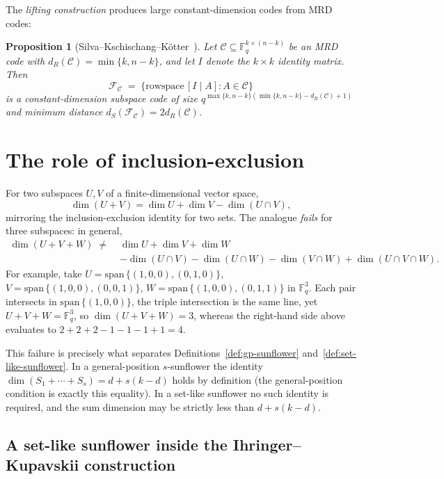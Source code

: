 \documentclass[11pt]{article}
\newtheorem{proposition}[theorem]{Proposition}
\theoremstyle{definition}
\newcommand{\F}{\mathbb{F}}
\newcommand{\rs}{\mathrm{rowspace}\,}
\newcommand{\spn}{\mathrm{span}\,}
\begin{document}
The \emph{lifting construction} produces large constant-dimension codes from MRD codes:

\begin{proposition}[Silva--Kschischang--K\"otter~\cite{silva}]\label{prop:lifting}
Let $\mathcal{C} \subseteq \F_q^{k \times (n-k)}$ be an MRD code with $d_R(\mathcal{C}) = \min\{k, n-k\}$, and let $I$ denote the $k \times k$ identity matrix. Then
\[
\mathcal{F}_{\mathcal{C}} \;=\; \{ \rs [I \mid A] : A \in \mathcal{C}\}
\]
is a constant-dimension subspace code of size $q^{\max\{k, n-k\}(\min\{k, n-k\} - d_R(\mathcal{C}) + 1)}$ and minimum distance $d_S(\mathcal{F}_{\mathcal{C}}) = 2 d_R(\mathcal{C})$.
\end{proposition}

\section{The role of inclusion-exclusion}\label{sec:incl-excl}

For two subspaces $U, V$ of a finite-dimensional vector space,
\[
\dim(U + V) = \dim U + \dim V - \dim(U \cap V),
\]
mirroring the inclusion-exclusion identity for two sets. The analogue \emph{fails} for three subspaces: in general,
\begin{align*}
\dim(U + V + W) \;\neq\; & \dim U + \dim V + \dim W \\
& - \dim(U \cap V) - \dim(U \cap W) - \dim(V \cap W) + \dim(U \cap V \cap W).
\end{align*}
For example, take $U = \spn\{(1,0,0), (0,1,0)\}$, $V = \spn\{(1,0,0), (0,0,1)\}$, $W = \spn\{(1,0,0), (0,1,1)\}$ in $\F_q^3$. Each pair intersects in $\spn\{(1,0,0)\}$, the triple intersection is the same line, yet $U + V + W = \F_q^3$, so $\dim(U+V+W) = 3$, whereas the right-hand side above evaluates to $2 + 2 + 2 - 1 - 1 - 1 + 1 = 4$.

This failure is precisely what separates Definitions~\ref{def:gp-sunflower} and~\ref{def:set-like-sunflower}. In a general-position $s$-sunflower the identity $\dim(S_1+\cdots+S_s) = d + s(k-d)$ holds by definition (the general-position condition is exactly this equality). In a set-like sunflower no such identity is required, and the sum dimension may be strictly less than $d + s(k-d)$.

\subsection{A set-like sunflower inside the Ihringer--Kupavskii construction}
\end{document}
